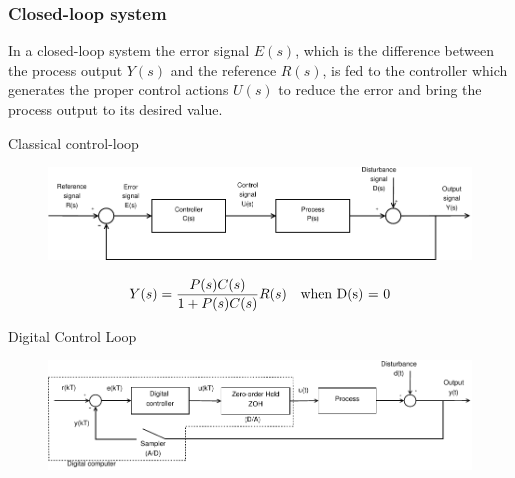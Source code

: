 \begin{frame}
	\frametitle{Closed-loop system}
	\begin{definition}
	{\small In a closed-loop system the error signal $E(s)$, which is the difference
	between the process output $Y(s)$ and the reference $R(s)$, is fed to the controller
	which generates the proper control actions $U(s)$ to reduce the error and bring the process output to its desired value.}
	\end{definition}
	\begin{block}{Classical control-loop}
		\begin{figure}
			\centering
			\includegraphics[width=0.9\linewidth]{Closed-Loop}
			\label{fig:Closed-Loop}
		\end{figure}
		\[ Y(s) =  \frac{P(s)C(s)}{1 + P(s)C(s)}R(s) \text{\quad when D(s) = 0}\]
	\end{block}
\end{frame}


\begin{frame}
	\begin{block}{Digital Control Loop}
		\begin{figure}
			\centering
			\includegraphics[width=1\linewidth]{digital-control-system}
			\label{fig:digital-control-system}
		\end{figure}
	\end{block}
\end{frame}

